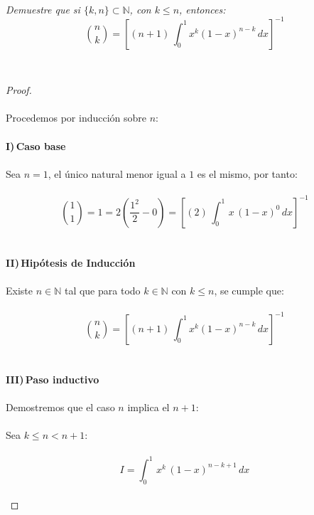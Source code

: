 \documentclass[11pt,letterpaper]{article}
\newcommand{\N}{\mathbb{N}}
\begin{document}
\,\\
\begin{tcolorbox}[
	title = \textcolor{black}{\textcolor{white}{Problema}},]
\textit{Demuestre que si $\{k,n\}\subset \mathbb{N}$, con $k\leq n$, entonces:\,\\
\begin{equation*}
\binom{n}{k}=\left[(n+1)\,\int_{0}^{1}x^k(1-x)^{n-k}\,dx\right]^{-1}
\end{equation*}
}
\end{tcolorbox}\,\\
\begin{proof}\,\\
    \,\\
Procedemos por inducci\'on sobre $n$:\,\\
    \,\\
\textbf{I)\,Caso base}\,\\
    \,\\
Sea $n=1$, el \'unico natural menor igual a $1$ es el mismo, por tanto:\,\\
    \,\\
\begin{equation*}
        \binom{1}{1}=1=2\left(\frac{1^2}{2}-0\right)=\left[(2)\,\int_{0}^{1}\,x\,(1-x)^0\,dx\right]^{-1}
\end{equation*}\,\\
    \,\\
\textbf{II)\,Hip\'otesis de Inducci\'on}\,\\
\,\\
Existe $n\in \mathbb{N}$ tal que para todo $k\in \N$ con $k\leq n$, se cumple que:\,\\
\,\\
\begin{equation*}
    \binom{n}{k}=\left[(n+1)\,\int_{0}^{1}x^k(1-x)^{n-k}\,dx\right]^{-1}
\end{equation*}\,\\
\newpage
\,\\
\textbf{III)\,Paso inductivo}\,\\
\,\\
Demostremos que el caso $n$ implica el $n+1$:\,\\
\,\\
Sea $k\leq n <n+1$:\,\\
\,\\
\begin{equation*}
    I=\int_{0}^{1}\,x^k\,(1-x)^{n-k+1}\,dx
\end{equation*}\,\\

\end{proof}
\end{document}
